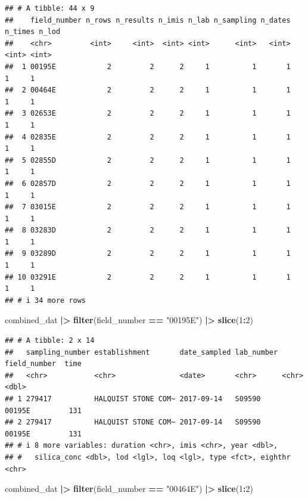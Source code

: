 \documentclass[
]{article}
\newenvironment{Shaded}{\begin{snugshade}}{\end{snugshade}}
\newcommand{\DecValTok}[1]{\textcolor[rgb]{0.00,0.00,0.81}{#1}}
\newcommand{\FunctionTok}[1]{\textcolor[rgb]{0.13,0.29,0.53}{\textbf{#1}}}
\newcommand{\NormalTok}[1]{#1}
\newcommand{\SpecialCharTok}[1]{\textcolor[rgb]{0.81,0.36,0.00}{\textbf{#1}}}
\newcommand{\StringTok}[1]{\textcolor[rgb]{0.31,0.60,0.02}{#1}}
\begin{document}
\begin{verbatim}
## # A tibble: 44 x 9
##    field_number n_rows n_results n_imis n_lab n_sampling n_dates n_times n_lod
##    <chr>         <int>     <int>  <int> <int>      <int>   <int>   <int> <int>
##  1 00195E            2         2      2     1          1       1       1     1
##  2 00464E            2         2      2     1          1       1       1     1
##  3 02653E            2         2      2     1          1       1       1     1
##  4 02835E            2         2      2     1          1       1       1     1
##  5 02855D            2         2      2     1          1       1       1     1
##  6 02857D            2         2      2     1          1       1       1     1
##  7 03015E            2         2      2     1          1       1       1     1
##  8 03283D            2         2      2     1          1       1       1     1
##  9 03289D            2         2      2     1          1       1       1     1
## 10 03291E            2         2      2     1          1       1       1     1
## # i 34 more rows
\end{verbatim}

\begin{Shaded}
\begin{Highlighting}[]
\NormalTok{combined\_dat }\SpecialCharTok{|\textgreater{}} 
  \FunctionTok{filter}\NormalTok{(field\_number }\SpecialCharTok{==} \StringTok{"00195E"}\NormalTok{) }\SpecialCharTok{|\textgreater{}} 
  \FunctionTok{slice}\NormalTok{(}\DecValTok{1}\SpecialCharTok{:}\DecValTok{2}\NormalTok{)  }
\end{Highlighting}
\end{Shaded}

\begin{verbatim}
## # A tibble: 2 x 14
##   sampling_number establishment       date_sampled lab_number field_number  time
##   <chr>           <chr>               <date>       <chr>      <chr>        <dbl>
## 1 279417          HALQUIST STONE COM~ 2017-09-14   S09590     00195E         131
## 2 279417          HALQUIST STONE COM~ 2017-09-14   S09590     00195E         131
## # i 8 more variables: duration <chr>, imis <chr>, year <dbl>,
## #   silica_conc <dbl>, lod <lgl>, loq <lgl>, type <fct>, eighthr <chr>
\end{verbatim}

\begin{Shaded}
\begin{Highlighting}[]
\NormalTok{combined\_dat }\SpecialCharTok{|\textgreater{}} 
  \FunctionTok{filter}\NormalTok{(field\_number }\SpecialCharTok{==} \StringTok{"00464E"}\NormalTok{) }\SpecialCharTok{|\textgreater{}} 
  \FunctionTok{slice}\NormalTok{(}\DecValTok{1}\SpecialCharTok{:}\DecValTok{2}\NormalTok{)}
\end{Highlighting}
\end{Shaded}
\end{document}
